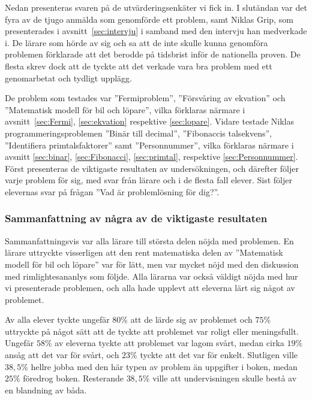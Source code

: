 \textcolor{lila}{Nedan presenteras svaren på de utvärderingsenkäter vi fick in. I slutändan var det fyra av de tjugo anmälda som genomförde ett problem, samt Niklas Grip, som presenterades i avsnitt~\ref{sec:intervju} i samband med den intervju han medverkade i. De lärare som hörde av sig och sa att de inte skulle kunna genomföra problemen förklarade att det berodde på tidsbrist inför de nationella proven. De flesta skrev dock att de tyckte att det verkade vara bra problem med ett genomarbetat och tydligt upplägg.}

\textcolor{lila}{De problem som testades var ''Fermiproblem'', ''Försvåring av ekvation'' och ''Matematisk modell för bil och löpare'', vilka förklaras närmare i avsnitt~\ref{sec:Fermi}, \ref{sec:ekvation} respektive \ref{sec:lopare}. Vidare testade Niklas programmeringsproblemen ''Binär till decimal'', ''Fibonaccis talsekvens'', ''Identifiera primtalsfaktorer'' samt ''Personnummer'', vilka förklaras närmare i avsnitt \ref{sec:binar}, \ref{sec:Fibonacci}, \ref{sec:primtal}, respektive \ref{sec:Personnummer}.
Först presenteras de viktigaste resultaten av undersökningen, och därefter följer varje problem för sig, med svar från lärare och i de flesta fall elever. Sist följer elevernas svar på frågan ''Vad är problemlösning för dig?''.}

\subsubsection{Sammanfattning av några av de viktigaste resultaten}
    \textcolor{lila}{Sammanfattningsvis var alla lärare till största delen nöjda med problemen. En lärare uttryckte visserligen att den rent matematiska delen av ''Matematisk modell för bil och löpare'' var för lätt, men var mycket nöjd med den diskussion med rimlightesananlys som följde. Alla lärarna var också väldigt nöjda med hur vi presenterade problemen, och alla hade upplevt att eleverna lärt sig något av problemet.}
    
    \textcolor{lila}{Av alla elever tyckte ungefär $80\%$ att de lärde sig av problemet och $75\%$ uttryckte på något sätt att de tyckte att problemet var roligt eller meningsfullt. Ungefär $58\%$ av eleverna tyckte att problemet var lagom svårt, medan cirka $19\%$ ansåg att det var för svårt, och $23\%$ tyckte att det var för enkelt. Slutligen ville $38,5\%$ hellre jobba med den här typen av problem än uppgifter i boken, medan $25\%$ föredrog boken. Resterande $38,5\%$ ville att undervisningen skulle bestå av en blandning av båda.}
    
